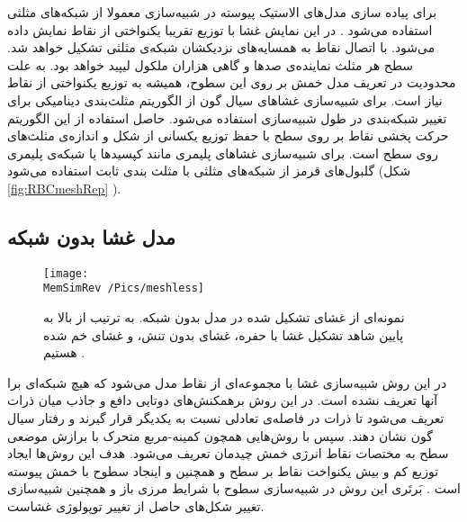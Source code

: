 برای پیاد‌ه سازی مدل‌های الاستیک پیوسته در شبیه‌سازی معمولا از شبکه‌های مثلثی استفاده می‌شود 
\cite{Gompper1997, NelsonBook2004}.
در این نمایش  غشا با توزیع تقریبا یکنواختی از نقاط نمایش داده می‌شود. با اتصال نقاط به همسایه‌های نزدیکشان شبکه‌ی مثلثی تشکیل خواهد شد. سطح هر مثلث نماینده‌ی صدها و گاهی هزاران ملکول لیپید خواهد بود. به علت محدودیت در تعریف مدل خمش بر روی این سطوح، همیشه به توزیع یکنواختی از نقاط نیاز است. برای شبیه‌سازی غشاهای سیال گون  از الگوریتم مثلث‌بندی دینامیکی
\cite{Boal1992PRA, Gompper1992Science}
برای تغییر شبکه‌بندی در طول شبیه‌سازی استفاده می‌شود. حاصل استفاده از این الگوریتم حرکت پخشی
 نقاط بر روی سطح با حفظ توزیع یکسانی از شکل و اندازه‌ی مثلث‌های روی سطح است. برای شبیه‌سازی غشاهای پلیمری مانند کپسیدها
 یا شبکه‌ی پلیمری گلبول‌های قرمز از شبکه‌های مثلثی با مثلث بندی ثابت استفاده می‌شود (شکل 
 \ref{fig:RBCmeshRep}
).

\subsection{
 مدل غشا بدون شبکه‌
 }
\begin{figure}[h]
\begin{center}
\texttt{[image: \\MemSimRev /Pics/meshless]}
\caption{
نمونه‌ای از غشای تشکیل شده در مدل بدون شبکه. به ترتیب از بالا به پایین شاهد تشکیل غشا با حفره، غشای بدون تنش، و غشای خم شده هستیم
\cite{Noguchi2006PRE}.
}
\label{fig:meshless}
\end{center}
\end{figure}
در این روش شبیه‌سازی غشا با مجموعه‌ای از نقاط مدل می‌شود که هیچ شبکه‌ای برا آنها تعریف نشده است. در این روش برهمکنش‌های دوتایی دافع و جاذب میان ذرات تعریف می‌شود تا ذرات در فاصله‌ی تعادلی نسبت به یکدیگر قرار گیرند و رفتار سیال گون نشان دهند. سپس با روش‌هایی همچون کمینه-مربع متحرک
با برازش
 موضعی سطح به مختصات نقاط انرژی خمش چیدمان تعریف می‌شود. هدف این روش‌ها ایجاد  توزیع کم و بیش یکنواخت نقاط بر سطح و همچنین و اینجاد سطوح با خمش پیوسته
است
\cite{Noguchi2006PRE}.
بَرتَری این روش در شبیه‌سازی سطوح با شرایط مرزی باز و همچنین شبیه‌سازی تغییر شکل‌های حاصل از تغییر توپولوژی غشاست.








